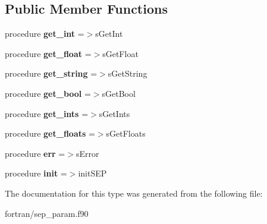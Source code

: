 \subsection*{Public Member Functions}
\begin{DoxyCompactItemize}
\item 
\mbox{\label{structsep__param__mod_1_1sepparam_a7267320f743ad3466a7c1a03ce2eb612}} 
procedure {\bfseries get\+\_\+int} =$>$s\+Get\+Int
\item 
\mbox{\label{structsep__param__mod_1_1sepparam_af264bc8d9deb0c67290018ecc0c7bac9}} 
procedure {\bfseries get\+\_\+float} =$>$s\+Get\+Float
\item 
\mbox{\label{structsep__param__mod_1_1sepparam_aec82e78712473722fc95e05505da185d}} 
procedure {\bfseries get\+\_\+string} =$>$s\+Get\+String
\item 
\mbox{\label{structsep__param__mod_1_1sepparam_a252ea06dc67329c22de296c0922860d6}} 
procedure {\bfseries get\+\_\+bool} =$>$s\+Get\+Bool
\item 
\mbox{\label{structsep__param__mod_1_1sepparam_a48cbefb7e62f4c7de0f9bed7886176ed}} 
procedure {\bfseries get\+\_\+ints} =$>$s\+Get\+Ints
\item 
\mbox{\label{structsep__param__mod_1_1sepparam_ab52b49f5e4a1e92b574badcf78d1e75c}} 
procedure {\bfseries get\+\_\+floats} =$>$s\+Get\+Floats
\item 
\mbox{\label{structsep__param__mod_1_1sepparam_add3cc3fab511e144d84f3d8e4fba2435}} 
procedure {\bfseries err} =$>$s\+Error
\item 
\mbox{\label{structsep__param__mod_1_1sepparam_ade0898f9c1f969ee44ff677614cb09cd}} 
procedure {\bfseries init} =$>$init\+S\+EP
\end{DoxyCompactItemize}


The documentation for this type was generated from the following file\+:\begin{DoxyCompactItemize}
\item 
fortran/sep\+\_\+param.\+f90\end{DoxyCompactItemize}
